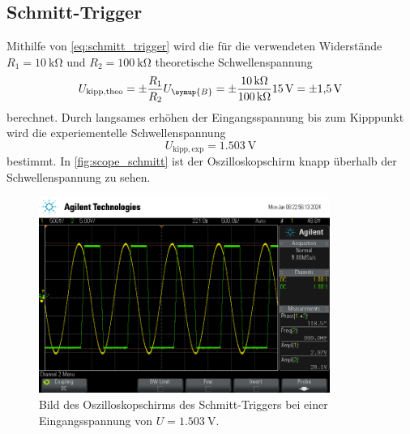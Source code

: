\subsection{Schmitt-Trigger}
Mithilfe von \autoref{eq:schmitt_trigger} wird die für die verwendeten Widerstände $R_1=\qty{10}{\kilo\ohm}$ und $R_2=\qty{100}{\kilo\ohm}$ theoretische Schwellenspannung 
\begin{equation*}
  U_{\mathrm{kipp, theo}} = \pm \frac{R_1}{R_2} U_{\symup{B}} = \pm \frac{\qty{10}{\kilo\ohm}}{\qty{100}{\kilo\ohm}} \qty{15}{\volt} = \pm\qty{1,5}{\volt}
\end{equation*}
berechnet.
Durch langsames erhöhen der Eingangsspannung bis zum Kipppunkt wird die experiementelle Schwellenspannung 
\begin{equation*}
  U_{\mathrm{kipp, exp}} = \qty{1,503}{\volt}
\end{equation*}
bestimmt. In \autoref{fig:scope_schmitt} ist der Oszilloskopschirm knapp überhalb der Schwellenspannung zu sehen.
\begin{figure}
  \centering
  \includegraphics[height=6.4cm]{content/scope/scope_15.png}
  \caption{Bild des Oszilloskopschirms des Schmitt-Triggers bei einer Eingangsspannung von $U=\qty{1,503}{\volt}$.}
  \label{fig:scope_schmitt}
\end{figure} 

